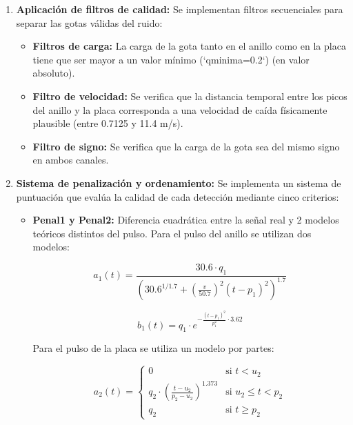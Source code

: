 \documentclass[12pt,a4paper]{article}
\begin{document}
\begin{enumerate}
\item \textbf{Aplicación de filtros de calidad:} Se implementan filtros secuenciales para separar
las gotas válidas del ruido:

\begin{itemize}

\item \textbf{Filtros de carga:} La carga de la gota tanto en el anillo como en la placa tiene
que ser mayor a un valor mínimo (`qminima=0.2`) (en valor absoluto).

\item \textbf{Filtro de velocidad:} Se verifica que la distancia temporal entre los picos del
anillo y la placa corresponda a una velocidad de caída físicamente plausible
(entre 0.7125 y 11.4 m/s).

\item \textbf{Filtro de signo:} Se verifica que la carga de la gota sea del mismo signo en
ambos canales.
\end{itemize}

\item \textbf{Sistema de penalización y ordenamiento:} Se implementa un sistema de puntuación que evalúa la calidad de cada detección mediante cinco criterios:

\begin{itemize}

    \item \textbf{Penal1 y Penal2:} Diferencia cuadrática entre la señal real y 2 modelos teóricos distintos
    del pulso.
    Para el pulso del anillo se utilizan dos modelos:
    
    \begin{equation}
        a_1(t) = \frac{30.6 \cdot q_1}{\left(30.6^{1/1.7} + \left(\frac{v}{50.7}\right)^2(t-p_1)^2\right)^{1.7}}
    \end{equation}
    
    \begin{equation}
        b_1(t) = q_1 \cdot e^{-\frac{(t-p_1)^2}{p_1^2} \cdot 3.62}
    \end{equation}

    Para el pulso de la placa se utiliza un modelo por partes:

    \begin{equation}
        a_2(t) = \begin{cases}
            0 & \text{si } t < u_2 \\
            q_2 \cdot \left(\frac{t-u_2}{p_2-u_2}\right)^{1.373} & \text{si } u_2 \leq t < p_2 \\
            q_2 & \text{si } t \geq p_2
        \end{cases}
    \end{equation}


\end{itemize}
\end{enumerate}
\end{document}
